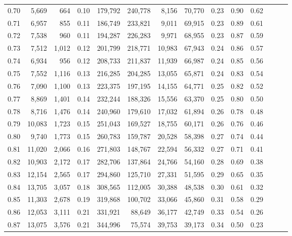 \begin{tabular}{rrrrrrrrrrrrrr}
0.70 &   5,669 &    664 &  0.10 &  179,792 &  240,778 &   8,156 &  70,770 &  0.23 &  0.90 &      0.62 \\
0.71 &   6,957 &    855 &  0.11 &  186,749 &  233,821 &   9,011 &  69,915 &  0.23 &  0.89 &      0.61 \\
0.72 &   7,538 &    960 &  0.11 &  194,287 &  226,283 &   9,971 &  68,955 &  0.23 &  0.87 &      0.59 \\
0.73 &   7,512 &  1,012 &  0.12 &  201,799 &  218,771 &  10,983 &  67,943 &  0.24 &  0.86 &      0.57 \\
0.74 &   6,934 &    956 &  0.12 &  208,733 &  211,837 &  11,939 &  66,987 &  0.24 &  0.85 &      0.56 \\
0.75 &   7,552 &  1,116 &  0.13 &  216,285 &  204,285 &  13,055 &  65,871 &  0.24 &  0.83 &      0.54 \\
0.76 &   7,090 &  1,100 &  0.13 &  223,375 &  197,195 &  14,155 &  64,771 &  0.25 &  0.82 &      0.52 \\
0.77 &   8,869 &  1,401 &  0.14 &  232,244 &  188,326 &  15,556 &  63,370 &  0.25 &  0.80 &      0.50 \\
0.78 &   8,716 &  1,476 &  0.14 &  240,960 &  179,610 &  17,032 &  61,894 &  0.26 &  0.78 &      0.48 \\
0.79 &  10,083 &  1,723 &  0.15 &  251,043 &  169,527 &  18,755 &  60,171 &  0.26 &  0.76 &      0.46 \\
0.80 &   9,740 &  1,773 &  0.15 &  260,783 &  159,787 &  20,528 &  58,398 &  0.27 &  0.74 &      0.44 \\
0.81 &  11,020 &  2,066 &  0.16 &  271,803 &  148,767 &  22,594 &  56,332 &  0.27 &  0.71 &      0.41 \\
0.82 &  10,903 &  2,172 &  0.17 &  282,706 &  137,864 &  24,766 &  54,160 &  0.28 &  0.69 &      0.38 \\
0.83 &  12,154 &  2,565 &  0.17 &  294,860 &  125,710 &  27,331 &  51,595 &  0.29 &  0.65 &      0.35 \\
0.84 &  13,705 &  3,057 &  0.18 &  308,565 &  112,005 &  30,388 &  48,538 &  0.30 &  0.61 &      0.32 \\
0.85 &  11,303 &  2,678 &  0.19 &  319,868 &  100,702 &  33,066 &  45,860 &  0.31 &  0.58 &      0.29 \\
0.86 &  12,053 &  3,111 &  0.21 &  331,921 &   88,649 &  36,177 &  42,749 &  0.33 &  0.54 &      0.26 \\
0.87 &  13,075 &  3,576 &  0.21 &  344,996 &   75,574 &  39,753 &  39,173 &  0.34 &  0.50 &      0.23 \\

\end{tabular}
